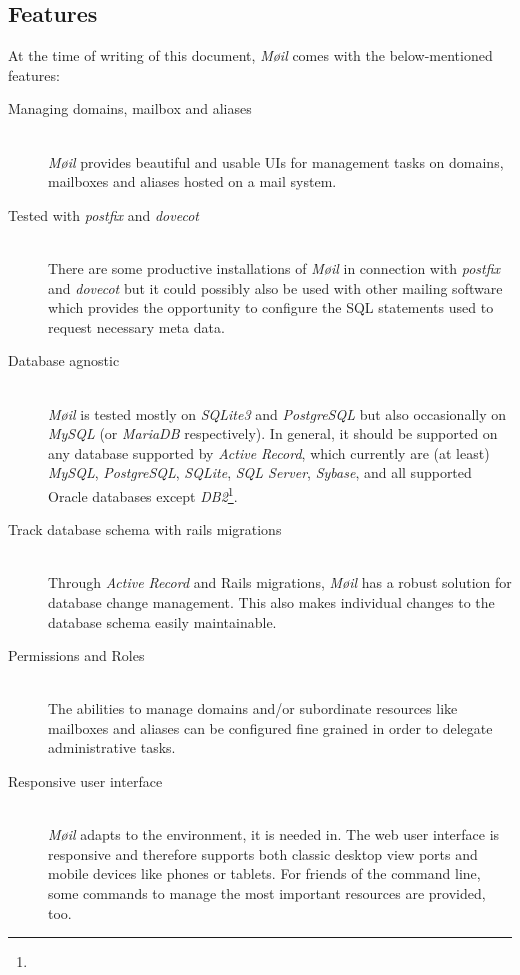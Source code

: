 \documentclass[12pt,a4paper]{scrartcl}
\begin{document}
		\subsection{Features}
		\label{sec:moeil:features}
			At the time of writing of this document, \emph{Møil} comes with the
			below-mentioned features:

			\begin{description}
				\item[\rm Managing domains, mailbox and aliases]\ \\
					\emph{Møil} provides beautiful and usable \acp{UI} for
					management tasks on domains, mailboxes and aliases hosted
					on a mail system.

				\item[\rm Tested with \emph{postfix} and \emph{dovecot}]\ \\
					There are some productive installations of \emph{Møil} in
					connection with \emph{postfix} and \emph{dovecot} but it
					could possibly also be used with other mailing software
					which provides the opportunity to configure the \ac{SQL}
					statements used to request necessary meta data.
				
				\item[\rm Database agnostic]\ \\
					\emph{Møil} is tested mostly on \emph{SQLite3} and
					\emph{PostgreSQL} but also occasionally on \emph{MySQL} (or
					\emph{MariaDB} respectively). In general, it should be
					supported on any database supported by \emph{Active
					Record}, which currently are (at least) \emph{MySQL},
					\emph{PostgreSQL}, \emph{SQLite}, \emph{SQL Server},
					\emph{Sybase}, and all supported Oracle databases except
					\emph{DB2}\footnote{\urlARSupport}.

				\item[\rm Track database schema with rails migrations]\ \\
					Through \emph{Active Record} and \ac{Rails} migrations,
					\emph{Møil} has a robust solution for database change
					management. This also makes individual changes to the
					database schema easily maintainable.

				\item[\rm Permissions and Roles]\ \\
					The abilities to manage domains and/or subordinate
					resources like mailboxes and aliases can be configured fine
					grained in order to delegate administrative tasks.

				\item[\rm Responsive user interface]\ \\
					\emph{Møil} adapts to the environment, it is needed in. The
					web user interface is responsive and therefore supports
					both classic desktop view ports and mobile devices like
					phones or tablets. For friends of the command line, some
					commands to manage the most important resources are
					provided, too.


\end{description}
\end{document}
